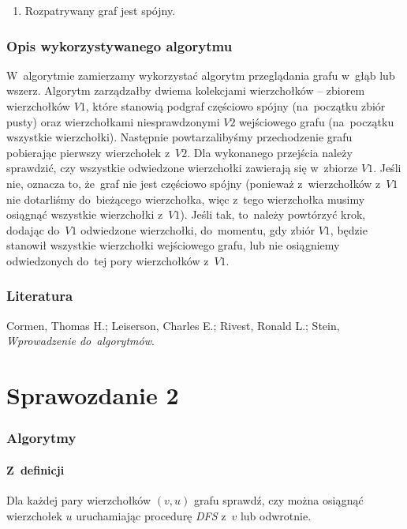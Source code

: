 \documentclass[a4paper,12pt]{mwart}
\begin{document}
\begin{enumerate}
\item Rozpatrywany graf jest spójny.
\end{enumerate}

\section{Opis wykorzystywanego algorytmu}

W~algorytmie zamierzamy wykorzystać algorytm przeglądania grafu w~głąb lub
wszerz. Algorytm zarządzałby dwiema kolekcjami wierzchołków -- zbiorem
wierzchołków $V1$, które stanowią podgraf częściowo spójny (na~początku zbiór
pusty) oraz wierzchołkami niesprawdzonymi $V2$ wejściowego grafu (na~początku
wszystkie wierzchołki). Następnie powtarzalibyśmy przechodzenie grafu
pobierając pierwszy wierzchołek z~$V2$. Dla wykonanego przejścia należy
sprawdzić, czy wszystkie odwiedzone wierzchołki zawierają się w~zbiorze $V1$.
Jeśli nie, oznacza to, że~graf nie jest częściowo spójny (ponieważ
z~wierzchołków z~$V1$ nie dotarliśmy do~bieżącego wierzchołka, więc z~tego
wierzchołka musimy osiągnąć wszystkie wierzchołki z~$V1$). Jeśli tak, to~należy
powtórzyć krok, dodając do~$V1$ odwiedzone wierzchołki, do~momentu, gdy zbiór
$V1$, będzie stanowił wszystkie wierzchołki wejściowego grafu, lub nie
osiągniemy odwiedzonych do~tej pory wierzchołków z~$V1$.

\section{Literatura}

\noindent Cormen, Thomas H.; Leiserson, Charles E.; Rivest, Ronald L.; Stein,
\emph{Wprowadzenie do~algorytmów}.

\newpage

\part{Sprawozdanie 2}

\section{Algorytmy}

\subsection{Z~definicji}
\label{sec:from-definion-alg}

Dla każdej pary wierzchołków $(v, u)$ grafu sprawdź, czy można osiągnąć
wierzchołek $u$ uruchamiając procedurę \emph{DFS} z~$v$ lub odwrotnie.
\end{document}
